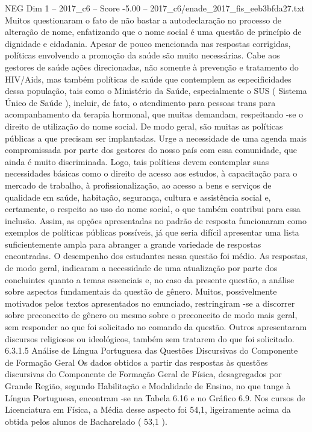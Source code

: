 \begin{textsample}{NEG Dim 1 – 2017\_c6 – Score -5.00 – 2017\_c6/enade\_2017\_fis\_eeb3bfda27.txt}
Muitos questionaram o fato de não bastar a autodeclaração no processo de alteração de nome, enfatizando que o nome social é uma questão de princípio de dignidade e cidadania.
Apesar de pouco mencionada nas respostas corrigidas, políticas envolvendo a promoção da saúde são muito necessárias.
Cabe aos gestores de saúde ações direcionadas, não somente à prevenção e tratamento do HIV/Aids, mas também políticas de saúde que contemplem as especificidades dessa população, tais como o Ministério da Saúde, especialmente o SUS ( Sistema Único de Saúde ), incluir, de fato, o atendimento para pessoas trans para acompanhamento da terapia hormonal, que muitas demandam, respeitando -se o direito de utilização do nome social.
De modo geral, são muitas as políticas públicas a que precisam ser implantadas.
Urge a necessidade de uma agenda mais compromissada por parte dos gestores do nosso país com essa comunidade, que ainda é muito discriminada.
Logo, tais políticas devem contemplar suas necessidades básicas como o direito de acesso aos estudos, à capacitação para o mercado de trabalho, à profissionalização, ao acesso a bens e serviços de qualidade em saúde, habitação, segurança, cultura e assistência social e, certamente, o respeito ao uso do nome social, o que também contribui para essa inclusão.
Assim, as opções apresentadas no padrão de resposta funcionaram como exemplos de políticas públicas possíveis, já que seria difícil apresentar uma lista suficientemente ampla para abranger a grande variedade de respostas encontradas.
O desempenho dos estudantes nessa questão foi médio.
As respostas, de modo geral, indicaram a necessidade de uma atualização por parte dos concluintes quanto a temas essenciais e, no caso da presente questão, a análise sobre aspectos fundamentais da questão de gênero.
Muitos, possivelmente motivados pelos textos apresentados no enunciado, restringiram -se a discorrer sobre preconceito de gênero ou mesmo sobre o preconceito de modo mais geral, sem responder ao que foi solicitado no comando da questão.
Outros apresentaram discursos religiosos ou ideológicos, também sem tratarem do que foi solicitado. 6.3.1.5 Análise de Língua Portuguesa das Questões Discursivas do Componente de Formação Geral Os dados obtidos a partir das respostas às questões discursivas do Componente de Formação Geral de Física, desagregados por Grande Região, segundo Habilitação e Modalidade de Ensino, no que tange à Língua Portuguesa, encontram -se na Tabela 6.16 e no Gráfico 6.9.
Nos cursos de Licenciatura em Física, a Média desse aspecto foi 54,1, ligeiramente acima da obtida pelos alunos de Bacharelado ( 53,1 ).

\end{textsample}
